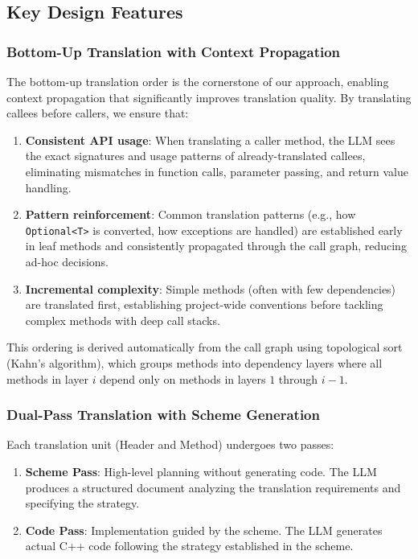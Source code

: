\subsection{Key Design Features}

\subsubsection{Bottom-Up Translation with Context Propagation}

The bottom-up translation order is the cornerstone of our approach, enabling context propagation that significantly improves translation quality. By translating callees before callers, we ensure that:

\begin{enumerate}
\item \textbf{Consistent API usage}: When translating a caller method, the LLM sees the exact signatures and usage patterns of already-translated callees, eliminating mismatches in function calls, parameter passing, and return value handling.

\item \textbf{Pattern reinforcement}: Common translation patterns (e.g., how \texttt{Optional<T>} is converted, how exceptions are handled) are established early in leaf methods and consistently propagated through the call graph, reducing ad-hoc decisions.

\item \textbf{Incremental complexity}: Simple methods (often with few dependencies) are translated first, establishing project-wide conventions before tackling complex methods with deep call stacks.
\end{enumerate}

This ordering is derived automatically from the call graph using topological sort (Kahn's algorithm), which groups methods into dependency layers where all methods in layer $i$ depend only on methods in layers $1$ through $i-1$.

\subsubsection{Dual-Pass Translation with Scheme Generation}

Each translation unit (Header and Method) undergoes two passes:
\begin{enumerate}
\item \textbf{Scheme Pass}: High-level planning without generating code. The LLM produces a structured document analyzing the translation requirements and specifying the strategy.
\item \textbf{Code Pass}: Implementation guided by the scheme. The LLM generates actual C++ code following the strategy established in the scheme.
\end{enumerate}

